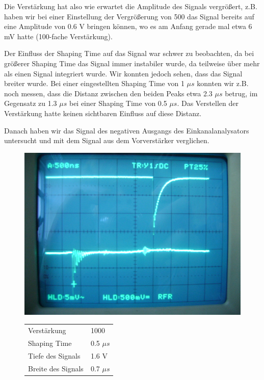 Die Verstärkung hat also wie erwartet die Amplitude des Signals vergrößert, z.B. haben wir bei einer Einstellung der Vergrößerung von 500 das Signal bereits auf eine Amplitude von 0.6 V bringen können, wo es am Anfang gerade mal etwa 6 mV hatte (100-fache Verstärkung). 

Der Einfluss der Shaping Time auf das Signal war schwer zu beobachten, da bei größerer Shaping Time das Signal immer instabiler wurde, da teilweise über mehr als einen Signal integriert wurde. Wir konnten jedoch sehen, dass das Signal breiter wurde. Bei einer eingestellten Shaping Time von 1 $\mu s$ konnten wir z.B. noch messen, dass die Distanz zwischen den beiden Peaks etwa 2.3 $\mu s$ betrug, im Gegensatz zu 1.3 $\mu s$ bei einer Shaping Time von 0.5 $\mu s$. Das Verstellen der Verstärkung hatte keinen sichtbaren Einfluss auf diese Distanz.

Danach haben wir das Signal des negativen Ausgangs des Einkanalanalysators untersucht und mit dem Signal aus dem Vorverstärker verglichen.

\begin{figure}[H]
\begin{minipage}{0.4\textwidth}
\centering \includegraphics[width = \textwidth]{messergebnisse/5.JPG}
\end{minipage}
\begin{minipage}{0.6\textwidth}
\centering \begin{tabular}{l l}
Verstärkung & 1000\\
Shaping Time & 0.5 $\mu s$\\
Tiefe des Signals & 1.6 V\\
Breite des Signals & 0.7 $\mu s$
\end{tabular}
\end{minipage}
\end{figure}

